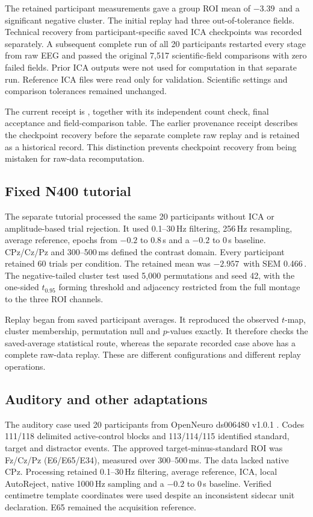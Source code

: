 The retained participant measurements gave a group ROI mean of \(-3.39\)\,\uV{} and a significant negative cluster. The initial replay had three out-of-tolerance fields. Technical recovery from participant-specific saved ICA checkpoints was recorded separately. A subsequent complete run of all 20 participants restarted every stage from raw EEG and passed the original 7,517 scientific-field comparisons with zero failed fields. Prior ICA outputs were not used for computation in that separate run. Reference ICA files were read only for validation. Scientific settings and comparison tolerances remained unchanged.

The current receipt is , together with its independent count check, final acceptance and field-comparison table. The earlier provenance receipt describes the checkpoint recovery before the separate complete raw replay and is retained as a historical record. This distinction prevents checkpoint recovery from being mistaken for raw-data recomputation.

\subsection*{Fixed N400 tutorial}
The separate tutorial processed the same 20 participants without ICA or amplitude-based trial rejection. It used 0.1--30\,Hz filtering, 256\,Hz resampling, average reference, epochs from \(-0.2\) to 0.8\,s and a \(-0.2\) to 0\,s baseline. CPz/Cz/Pz and 300--500\,ms defined the contrast domain. Every participant retained 60 trials per condition. The retained mean was \(-2.957\)\,\uV{} with SEM 0.466\,\uV{}. The negative-tailed cluster test used 5,000 permutations and seed 42, with the one-sided \(t_{0.95}\) forming threshold and adjacency restricted from the full montage to the three ROI channels.

Replay began from saved participant averages. It reproduced the observed \(t\)-map, cluster membership, permutation null and \(p\)-values exactly. It therefore checks the saved-average statistical route, whereas the separate recorded case above has a complete raw-data replay. These are different configurations and different replay operations.

\subsection*{Auditory and other adaptations}
The auditory case used 20 participants from OpenNeuro ds006480 v1.0.1 \citep{kim2025young}. Codes 111/118 delimited active-control blocks and 113/114/115 identified standard, target and distractor events. The approved target-minus-standard ROI was Fz/Cz/Pz (E6/E65/E34), measured over 300--500\,ms. The data lacked native CPz. Processing retained 0.1--30\,Hz filtering, average reference, ICA, local AutoReject, native 1000\,Hz sampling and a \(-0.2\) to 0\,s baseline. Verified centimetre template coordinates were used despite an inconsistent sidecar unit declaration. E65 remained the acquisition reference.

